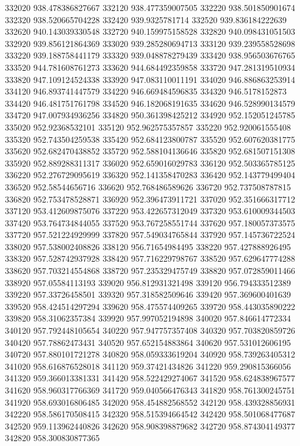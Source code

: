 {332020 938.478386827667
332120 938.477359007505
332220 938.501850901674
332320 938.520665704228
332420 939.9325781714
332520 939.836184222639
332620 940.143039330548
332720 940.159975158528
332820 940.098431051503
332920 939.856121864369
333020 939.285280694713
333120 939.239558528698
333220 939.188758441179
333320 939.048878279439
333420 938.956503676765
333520 944.781608761273
333620 944.684492359858
333720 947.281319510934
333820 947.109124524338
333920 947.083110011191
334020 946.886863253914
334120 946.893741447579
334220 946.669484596835
334320 946.5178152873
334420 946.481751761798
334520 946.182068191635
334620 946.528990134579
334720 947.007934936256
334820 950.361398425212
334920 952.152051245785
335020 952.92368532101
335120 952.962575357857
335220 952.920061555408
335320 952.743504259538
335420 952.684123800787
335520 952.607620381775
335620 952.682470438852
335720 952.588104136646
335820 952.681507151308
335920 952.889288311317
336020 952.659016029783
336120 952.503365785125
336220 952.276729095619
336320 952.141358470283
336420 952.143779499404
336520 952.58544656716
336620 952.768486589626
336720 952.737508787815
336820 952.753478528871
336920 952.396473911721
337020 952.351666317712
337120 953.412609875076
337220 953.422657312049
337320 953.610009344503
337420 953.764734844055
337520 953.767258551744
337620 957.180057373575
337720 957.521224929999
337820 957.549034765844
337920 957.145736722524
338020 957.538002408826
338120 956.71654984495
338220 957.427888926495
338320 957.528742937928
338420 957.716229798767
338520 957.629647774288
338620 957.703214554868
338720 957.235329475749
338820 957.072859011466
338920 957.05584113193
339020 956.812931321498
339120 956.794333512389
339220 957.33726458501
339320 957.318582509646
339420 957.369600401639
339520 958.424514297294
339620 958.475574409265
339720 958.443035890222
339820 958.31062357384
339920 957.997052194898
340020 957.846614772334
340120 957.792448105654
340220 957.947757357408
340320 957.703820859726
340420 957.78862473431
340520 957.652154883864
340620 957.531012606195
340720 957.880101721278
340820 958.059333619204
340920 958.739263405312
341020 958.616876528018
341120 959.37421434826
341220 959.290815366056
341320 959.366013381331
341420 958.522429274067
341520 958.624838967577
341620 958.960317766369
341720 959.040566476343
341820 958.761300245751
341920 958.693016806485
342020 958.454882568552
342120 958.439328856931
342220 958.586170508415
342320 958.515394664542
342420 958.501068477687
342520 959.113962440826
342620 958.908398879682
342720 958.874304149377
342820 958.300830877365
}
